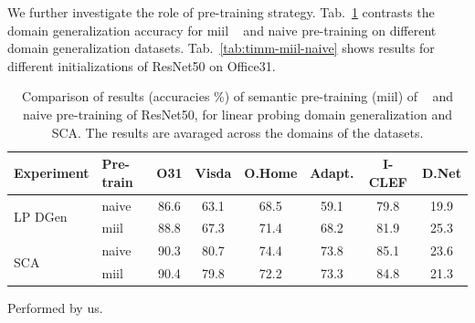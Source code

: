 \documentclass{article}
\begin{document}
We further investigate the role of pre-training strategy. Tab.~\ref{tab:miil-naive} contrasts the domain generalization accuracy for miil ~\citep{ridnik2021imagenet} and naive pre-training on different domain generalization datasets. Tab.~\ref{tab:timm-miil-naive} shows results for different initializations of ResNet50 on Office31. 
\begin{table}[h!]
\begin{center}
    \begin{threeparttable}
\caption{Comparison of results (accuracies \%) of semantic pre-training (miil) of ~\cite{ridnik2021imagenet} and naive pre-training of ResNet50, for linear probing domain generalization and SCA. The results are avaraged across the domains of the datasets.} 
\vspace{0.5cm}
\label{tab:miil-naive}

\begin{footnotesize}
\begin{tabular}{llcccccc}
\toprule
\textbf{Experiment} & \textbf{Pre-train} & \textbf{O31} &  \textbf{Visda} &  \textbf{O.Home} &  \textbf{Adapt.} &  \textbf{I-CLEF} &  \textbf{D.Net} \\
\midrule
\multirow{2}{*}{LP DGen} & naive\tnote{\textdagger}     &  86.6 &   63.1 &        68.5 &       59.1 &     79.8 &       19.9 \\
                      & miil                         &  88.8 &   67.3 &        71.4 &       68.2 &     81.9 &       25.3 \\
\midrule
\multirow{2}{*}{SCA}  & naive\tnote{\textdagger}     &  90.3 &   80.7 &        74.4 &       73.8 &     85.1 &       23.6 \\
                      & miil                         &  90.4 &   79.8 &        72.2 &       73.3 &     84.8 &       21.3 \\

\bottomrule
\end{tabular}
\end{footnotesize}


    \begin{tablenotes}
        \footnotesize
        \item[\textdagger] Performed by us.
    \end{tablenotes}
    
    \end{threeparttable}
        \end{center}
\end{table}
\end{document}
